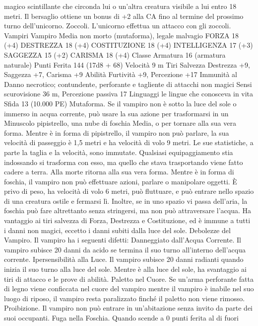 \begin{multicols}{2}
magico scintillante che circonda lui o un’altra creatura visibile a lui
entro 18 metri. Il bersaglio ottiene un bonus di +2 alla CA fino al
termine del prossimo turno dell’unicorno.
Zoccoli. L’unicorno effettua un attacco con gli zoccoli.
Vampiri
Vampiro
Media non morto (mutaforma), legale malvagio
FORZA 18 (+4)
DESTREZZA 18 (+4)
COSTITUZIONE 18 (+4)
INTELLIGENZA 17 (+3)
SAGGEZZA 15 (+2)
CARISMA 18 (+4)
Classe Armatura 16 (armatura naturale)
Punti Ferita 144 (17d8 + 68)
Velocità 9 m
Tiri Salvezza Destrezza +9, Saggezza +7, Carisma +9
Abilità Furtività +9, Percezione +17
Immunità al Danno necrotico; contundente, perforante e
tagliente di attacchi non magici
Sensi scurovisione 36 m, Percezione passiva 17
Linguaggi le lingue che conosceva in vita
Sfida 13 (10.000 PE)
Mutaforma. Se il vampiro non è sotto la luce del sole o immerso
in acqua corrente, può usare la sua azione per trasformarsi in un
Minuscolo pipistrello, una nube di foschia Media, o per tornare
alla sua vera forma.
Mentre è in forma di pipistrello, il vampiro non può parlare, la
sua velocità di passeggio è 1,5 metri e ha velocità di volo 9
metri. Le sue statistiche, a parte la taglia e la velocità, sono
immutate. Qualsiasi equipaggiamento stia indossando si
trasforma con esso, ma quello che stava trasportando viene fatto
cadere a terra. Alla morte ritorna alla sua vera forma.
Mentre è in forma di foschia, il vampiro non può effettuare
azioni, parlare o manipolare oggetti. È privo di peso, ha velocità
di volo 6 metri, può fluttuare, e può entrare nello spazio di una
creatura ostile e fermarsi lì. Inoltre, se in uno spazio vi passa
dell’aria, la foschia può fare altrettanto senza stringersi, ma non
può attraversare l’acqua. Ha vantaggio ai tiri salvezza di Forza,
Destrezza e Costituzione, ed è immune a tutti i danni non magici,
eccetto i danni subiti dalla luce del sole.
Debolezze del Vampiro. Il vampiro ha i seguenti difetti:
Danneggiato dall’Acqua Corrente. Il vampiro subisce 20 danni
da acido se termina il suo turno all’interno dell’acqua corrente.
Ipersensibilità alla Luce. Il vampiro subisce 20 danni radianti
quando inizia il suo turno alla luce del sole. Mentre è alla luce
del sole, ha svantaggio ai tiri di attacco e le prove di abilità.
Paletto nel Cuore. Se un’arma perforante fatta di legno viene
conficcata nel cuore del vampiro mentre il vampiro è inabile nel
suo luogo di riposo, il vampiro resta paralizzato finché il paletto
non viene rimosso.
Proibizione. Il vampiro non può entrare in un’abitazione senza
invito da parte dei suoi occupanti.
Fuga nella Foschia. Quando scende a 0 punti ferita al di fuori

\end{multicols}
